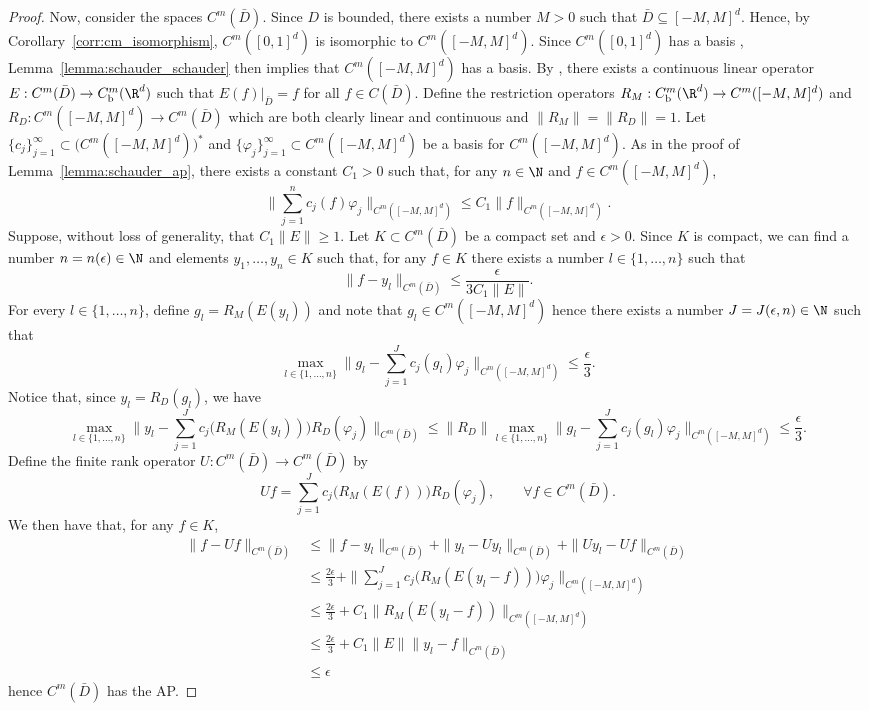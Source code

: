\begin{proof}
Now, consider the spaces \(C^m(\bar{D})\). Since \(D\) is bounded, there exists a number \(M > 0\)
such that \(\bar{D} \subseteq [-M,M]^d\).
Hence, by Corollary~\ref{corr:cm_isomorphism}, \(C^m ([0,1]^d)\) is isomorphic to \(C^m ([-M,M]^d)\).
Since \(C^m ([0,1]^d)\) has a basis \cite[Theorem 5]{ciesielski1972construction}, Lemma~\ref{lemma:schauder_schauder} then implies that
\(C^m ([-M,M]^d)\) has a basis. By \cite[Theorem 1]{fefferman2007cmextension}, 
there exists a continuous linear operator \(E : C^m (\bar{D}) \to C^m_{\text{b}}(\R^d)\)
such that \(E(f)|_{\bar{D}} = f\) for all \(f \in C(\bar{D})\).
Define the restriction operators \(R_M : C^m_{\text{b}}(\R^d) \to C^m([-M,M]^d)\) and \(R_D : C^m([-M,M]^d) \to C^m(\bar{D})\)
which are both clearly linear and continuous and \(\|R_M\| = \|R_D\| = 1\). Let \(\{c_j\}_{j=1}^\infty \subset \bigl ( C^m([-M,M]^d) \bigl )^*\)
and \(\{\varphi_j\}_{j=1}^\infty  \subset C^m([-M,M]^d)\) be a basis for \(C^m([-M,M]^d)\). 
As in the proof of Lemma~\ref{lemma:schauder_ap}, there exists a constant \(C_1 > 0\)
such that, for any \(n \in \N\) and \(f \in C^m([-M,M]^d) \), 
\[\|\sum_{j=1}^n c_j(f) \varphi_j\|_{C^m([-M,M]^d)} \leq C_1 \|f\|_{C^m([-M,M]^d)}.\]
Suppose, without loss of generality, that \(C_1 \|E\| \geq 1\). Let \(K \subset C^m(\bar{D})\)
be a compact set and \(\epsilon > 0\). Since \(K\) is compact, we can find a number \(n = n(\epsilon) \in \N\)
and elements \(y_1,\dots,y_n \in K\) such that, for any \(f \in K\) there exists a number \(l \in \{1,\dots,n\}\)
such that
\[\|f - y_l\|_{C^m(\bar{D})} \leq \frac{\epsilon}{3 C_1 \|E\|}.\]
For every \(l \in \{1,\dots,n\}\), define \(g_l = R_M (E(y_l))\) and note that \(g_l \in C^m([-M,M]^d)\)
hence there exists a number \(J = J(\epsilon,n) \in \N\) such that
\[\max_{l \in \{1,\dots,n\}} \|g_l - \sum_{j=1}^J c_j(g_l) \varphi_j \|_{C^m([-M,M]^d)} \leq \frac{\epsilon}{3}.\]
Notice that, since \(y_l = R_D(g_l)\), we have
\[ \max_{l \in \{1,\dots,n\}} \|y_l - \sum_{j=1}^J c_j \bigl ( R_M (E(y_l)) \bigl ) R_D(\varphi_j)\|_{C^m(\bar{D})} \leq \|R_D\| \max_{l \in \{1,\dots,n\}}  \|g_l - \sum_{j=1}^J c_j(g_l) \varphi_j \|_{C^m([-M,M]^d)} \leq \frac{\epsilon}{3}.\]
Define the finite rank operator \(U : C^m(\bar{D}) \to C^m(\bar{D})\) by
\[Uf = \sum_{j=1}^J c_j \bigl ( R_M (E(f)) \bigl ) R_D(\varphi_j), \qquad \forall f \in C^m(\bar{D}).\]
We then have that, for any \(f \in K\),
\begin{align*}
\|f - Uf\|_{C^m(\bar{D})} &\leq \|f - y_l\|_{C^m(\bar{D})} + \|y_l - Uy_l\|_{C^m(\bar{D})} + \|U y_l - Uf\|_{C^m(\bar{D})} \\
&\leq \frac{2\epsilon}{3} + \|\sum_{j=1}^J c_j \bigl( R_M(E(y_l - f)) \bigl ) \varphi_j \|_{C^m([-M,M]^d)} \\
&\leq \frac{2\epsilon}{3} + C_1 \|R_M(E(y_l - f))\|_{C^m([-M,M]^d)} \\
&\leq \frac{2\epsilon}{3} + C_1 \|E\| \|y_l - f\|_{C^m(\bar{D})} \\
&\leq \epsilon
\end{align*}
hence \(C^m(\bar{D})\) has the AP.


\end{proof}
